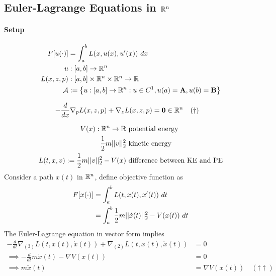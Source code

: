 \documentclass{article}
\begin{document}
	\subsection{Euler-Lagrange Equations in $\mathbb{R}^n$}
	\paragraph{Setup}
	\begin{align}
		F[u(\cdot)] &= \int_a^b L(x, u(x), u'(x))\ dx \\
		u &: [a, b] \to \mathbb{R}^n \\
		L(x, z, p) &: [a, b] \times \mathbb{R}^n \times \mathbb{R}^n \to \mathbb{R} \\
		\mathcal{{A}} &:= \left\{
			u: [a, b] \to \mathbb{R}^n: u \in C^1, u(a) = \textbf{A}, u(b) = \textbf{B}
		\right\}
	\end{align}

	\begin{theorem}
		\begin{align}
			- \frac{d}{dx} \nabla_p L(x, z, p) + \nabla_z L(x, z, p) &= \textbf{0} \in \mathbb{R}^n \quad (\dagger)
		\end{align}
	\end{theorem}
	
	\begin{example}
		\begin{align}
			V(x): \mathbb{R}^n \to \mathbb{R} &\text{{ potential energy}} \\
			\frac{1}{2} m \vert \vert {v} \vert \vert_2^2 &\text{{ kinetic energy}} \\
			L(t, x, v):= \frac{1}{2} m \vert \vert {v} \vert \vert_2^2 - V(x) &\text{{ difference between KE and PE}}
		\end{align}
		Consider a path $x(t)$ in $\mathbb{R}^n$, define objective function as
		\begin{align}
			F[x(\cdot)] &= \int_a^b L(t, x(t), x'(t))\ dt \\
			&= \int_a^b \frac{1}{2} m \vert \vert {\dot{x}(t)} \vert \vert_2^2 - V(x(t))\ dt
		\end{align}
		The Euler-Lagrange equation in vector form implies
		\begin{align}
			- \frac{d}{dt} \nabla_{(3)} L(t, x(t), \dot{x}(t))
			+ \nabla_{(2)} L(t, x(t), \dot{x}(t)) &= 0 \\
			\implies - \frac{d}{dt} m \dot{x}(t) - \nabla V(x(t)) &= 0 \\
			\implies m \ddot{x}(t) &= \nabla V(x(t))\quad (\dagger \dagger)
		\end{align}
	\end{example}
	
\end{document}
